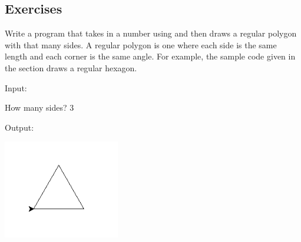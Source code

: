 \documentclass[11pt]{cselabheader}
\begin{document}
\pagebreak
\subsection{Exercises}
\label{subsec:turtleex}

  \begin{ex}[polygons2.py] Write a program that takes in a number using
     and then draws a regular polygon with that many sides. A
    regular polygon is one where each side is the same length and each corner is
    the same angle. For example, the sample code given in the section draws a
    regular hexagon.

    Input:

    \begin{verbatimcode}
How many sides? 3
    \end{verbatimcode}

    Output:
    \begin{center}
      \includegraphics[width=2.0in]{img/triangle}
    \end{center}
\end{ex}
\end{document}
